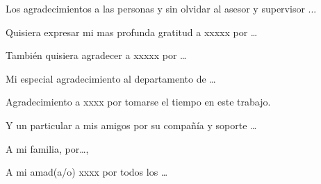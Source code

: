 \cleardoublepage
{}	
{}

\newenvironment{Acknowledgements}{ %
    \thispagestyle{empty}
    \null\vfill
    \begin{center}%
    	\Large\textit{\myAcknowledgements}
    	\bigskip
    \end{center}
}%
{\vfill\null}
\begin{Acknowledgements}
    Los agradecimientos a las personas y sin olvidar al asesor y supervisor    ...
    
    Quisiera expresar mi mas profunda gratitud a xxxxx por \ldots
    
    También quisiera agradecer a xxxxx por \ldots
    
    Mi especial agradecimiento al departamento de \ldots
    
    Agradecimiento a xxxx por tomarse el tiempo en este trabajo.
    
    Y un particular a mis amigos por su compañía y soporte \ldots
    
    A mi familia, por\ldots,    
    
    A mi amad(a/o) xxxx por todos los \ldots
\end{Acknowledgements}